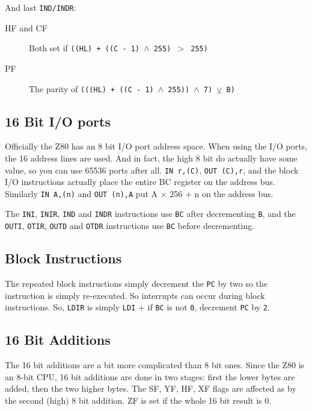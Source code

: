 \documentclass[12pt,twoside,openright,a4paper]{book}
\begin{document}
And last {\tt IND/INDR}:

\begin{description}

	\item[HF and CF]
	Both set if {\tt ((HL) + ((C - 1) $\wedge$ 255) $>$ 255)}

	\item[PF]
	The parity of {\tt (((HL) + ((C - 1) $\wedge$ 255)) $\wedge$ 7) $\veebar$ B)}

\end{description}


\subsection{16 Bit I/O ports}

Officially the Z80 has an 8 bit I/O port address space. When using the I/O ports, the 16 address lines are used. And in fact, the high 8 bit do actually have some value, so you can use 65536 ports after all. {\tt IN r,(C)}, {\tt OUT (C),r}, and the block I/O instructions  actually place the entire BC register on the address bus. Similarly {\tt IN A,(n)} and {\tt OUT (n),A} put A $\times$ 256 + n on the address bus.

The {\tt INI}, {\tt INIR}, {\tt IND} and {\tt INDR} instructions use {\tt BC} after decrementing {\tt B}, and the {\tt OUTI}, {\tt OTIR}, {\tt OUTD} and {\tt OTDR} instructions use {\tt BC} before decrementing.


\subsection{Block Instructions}

The repeated block instructions simply decrement the {\tt PC} by two so the instruction is simply re-executed. So interrupts can occur during block instructions. So, {\tt LDIR} is simply {\tt LDI} + if {\tt BC} is not {\tt 0}, decrement {\tt PC} by {\tt 2}.


\subsection{16 Bit Additions}

The 16 bit additions are a bit more complicated than 8 bit ones. Since the Z80 is an 8-bit CPU, 16 bit additions are done in two stages: first the lower bytes are added, then the two higher bytes. The SF, YF, HF, XF flags are affected as by the second (high) 8 bit addition. ZF is set if the whole 16 bit result is 0.
\end{document}
